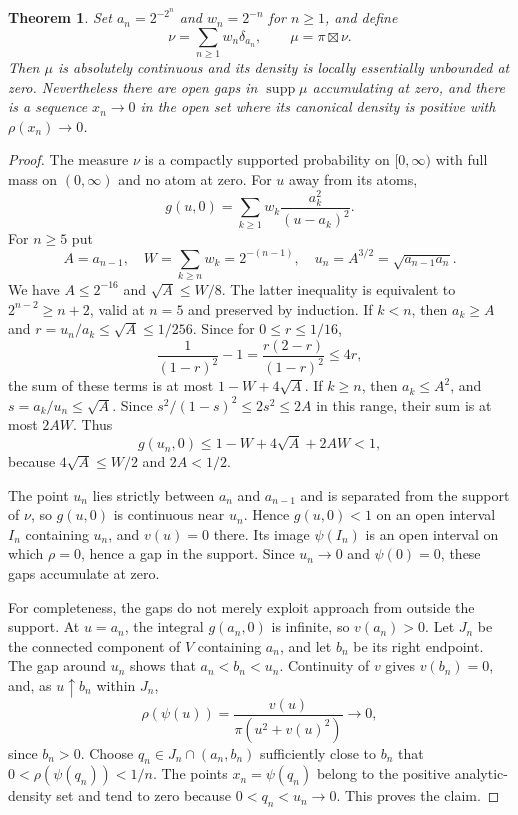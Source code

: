 \documentclass[11pt,a4paper]{article}
\newtheorem{theorem}{Theorem}[section]
\numberwithin{equation}{section}
\begin{document}
\begin{theorem}\label{thm:critical-oscillation}
Set $a_n=2^{-2^n}$ and $w_n=2^{-n}$ for $n\ge1$, and define
\[
 \nu=\sum_{n\ge1}w_n\delta_{a_n},\qquad
 \mu=\pi\boxtimes\nu.
\]
Then $\mu$ is absolutely continuous and its density is locally
essentially unbounded at zero.  Nevertheless there are open gaps in
$\operatorname{supp}\mu$ accumulating at zero, and there is a sequence
$x_n\to0$ in the open set where its canonical density is positive with
$\rho(x_n)\to0$.
\end{theorem}
\begin{proof}
The measure $\nu$ is a compactly supported probability on $[0,\infty)$
with full mass on $(0,\infty)$ and no atom at zero.  For $u$ away from its atoms,
\[
 g(u,0)=\sum_{k\ge1}w_k\frac{a_k^2}{(u-a_k)^2}.
\]
For $n\ge5$ put
\[
 A=a_{n-1},\quad W=\sum_{k\ge n}w_k=2^{-(n-1)},\quad
 u_n=A^{3/2}=\sqrt{a_{n-1}a_n}.
\]
We have $A\le2^{-16}$ and $\sqrt A\le W/8$.  The latter inequality is
equivalent to $2^{n-2}\ge n+2$, valid at $n=5$ and preserved by
induction.  If $k<n$, then $a_k\ge A$ and
$r=u_n/a_k\le\sqrt A\le1/256$.  Since for $0\le r\le1/16$,
\[
 \frac{1}{(1-r)^2}-1
 =\frac{r(2-r)}{(1-r)^2}\le4r,
\]
the sum of these terms is at most $1-W+4\sqrt A$.
If $k\ge n$, then $a_k\le A^2$, and $s=a_k/u_n\le\sqrt A$.
Since $s^2/(1-s)^2\le2s^2\le2A$ in this range, their sum is at most
$2AW$.  Thus
\[
 g(u_n,0)\le1-W+4\sqrt A+2AW<1,
\]
because $4\sqrt A\le W/2$ and $2A<1/2$.

The point $u_n$ lies strictly between $a_n$ and $a_{n-1}$ and is separated
from the support of $\nu$, so $g(u,0)$ is continuous near $u_n$.
Hence $g(u,0)<1$ on an open interval $I_n$ containing $u_n$, and
$v(u)=0$ there.  Its image $\psi(I_n)$ is an open interval on which
$\rho=0$, hence a gap in the support.  Since $u_n\to0$ and
$\psi(0)=0$, these gaps accumulate at zero.

For completeness, the gaps do not merely exploit approach from outside
the support.  At $u=a_n$, the integral $g(a_n,0)$ is infinite, so
$v(a_n)>0$.  Let $J_n$ be the connected component of $V$ containing
$a_n$, and let $b_n$ be its right endpoint.  The gap around $u_n$ shows
that $a_n<b_n<u_n$.  Continuity of $v$ gives $v(b_n)=0$, and, as
$u\uparrow b_n$ within $J_n$,
\[
 \rho(\psi(u))=\frac{v(u)}{\pi(u^2+v(u)^2)}\longrightarrow0,
\]
since $b_n>0$.  Choose $q_n\in J_n\cap(a_n,b_n)$ sufficiently close to
$b_n$ that $0<\rho(\psi(q_n))<1/n$.  The points
$x_n=\psi(q_n)$ belong to the positive analytic-density set and tend to
zero because $0<q_n<u_n\to0$.  This proves the claim.
\end{proof}
\end{document}
